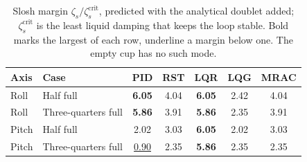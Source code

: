 \begin{table}[!ht]
\centering
\caption{Slosh margin $\zeta_s/\zeta_s^{\mathrm{crit}}$, predicted with the analytical doublet added; $\zeta_s^{\mathrm{crit}}$ is the least liquid damping that keeps the loop stable. Bold marks the largest of each row, underline a margin below one. The empty cup has no such mode.}
\label{tab:slosh}
\begin{tabular}{llccccc}
\toprule
Axis & Case & PID & RST & LQR & LQG & MRAC \\
\midrule
Roll & Half full & \textbf{6.05} & 4.04 & \textbf{6.05} & 2.42 & 4.04 \\
Roll & Three-quarters full & \textbf{5.86} & 3.91 & \textbf{5.86} & 2.35 & 3.91 \\
Pitch & Half full & 2.02 & 3.03 & \textbf{6.05} & 2.02 & 3.03 \\
Pitch & Three-quarters full & \underline{0.90} & 2.35 & \textbf{5.86} & 2.35 & 2.35 \\
\bottomrule
\end{tabular}
\end{table}